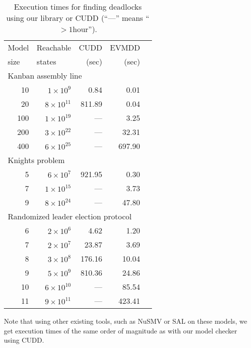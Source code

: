 \documentclass[nocover]             %
{NASA}                       %
\begin{document}
{\begin{table}[htb]
\begin{center}
    \begin{tabular}{|r||r||r|r|r|}
      \hline
      \multicolumn{1}{|l||}{Model} & \multicolumn{1}{l||}{Reachable} & CUDD & EVMDD \\
      \multicolumn{1}{|l||}{size}  & \multicolumn{1}{l||}{states} & (sec) & (sec) \\
      \hline
      \multicolumn{4}{|l|}{Kanban assembly line}\\
      \hline
      10 & $1\times10^{9}$   &    0.84 &    0.01 \\
      20 & $8\times10^{11}$  &  811.89 &    0.04 \\
      100 & $1\times10^{19}$ &   --- &    3.25 \\
      200 & $3\times10^{22}$ &   --- &   32.31 \\
      400 & $6\times10^{25}$ &   --- &  697.90 \\
      \hline
      \multicolumn{4}{|l|}{Knights problem}\\
      \hline
      5 & $6\times10^{7}$  &  921.95 &    0.30 \\
      7 & $1\times10^{15}$ &   --- &    3.73 \\
      9 & $8\times10^{24}$ &   --- &   47.80 \\
      \hline
      \multicolumn{4}{|l|}{Randomized leader election protocol}\\
      \hline
      6 & $2\times10^{6}$   &    4.62 &    1.20 \\
      7 & $2\times10^{7}$   &   23.87 &    3.69 \\
      8 & $3\times10^{8}$   &  176.16 &   10.04 \\
      9 & $5\times10^{9}$   &  810.36 &   24.86 \\
      10 & $6\times10^{10}$ &   ---   &   85.54 \\
      11 & $9\times10^{11}$ &   ---   &  423.41 \\
      \hline
    \end{tabular}
\vspace*{3mm}
    \caption{Execution times for finding deadlocks using our library or CUDD (``---'' means ``$>1$hour'').}
    \label{table-results}
  \end{center}
\end{table}
}

Note that using other existing tools, such as NuSMV or SAL on these models, we get execution times of the same order of magnitude as 
with our model checker using CUDD.
\end{document}
